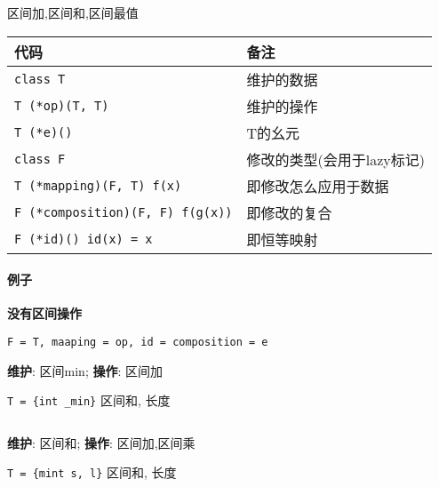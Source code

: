 区间加,区间和,区间最值

\begin{tabular}{ll}
    \hline
    代码                                    & 备注               \\
    \hline
    \verb|class T|                        & 维护的数据            \\
    \verb|T (*op)(T, T)|                  & 维护的操作            \\
    \verb|T (*e)()|                       & T的幺元             \\
    \verb|class F|                        & 修改的类型(会用于lazy标记) \\
    \verb|T (*mapping)(F, T) f(x)|        & 即修改怎么应用于数据       \\
    \verb|F (*composition)(F, F) f(g(x))| & 即修改的复合           \\
    \verb|F (*id)() id(x) = x|            & 即恒等映射            \\
    \hline
\end{tabular}

\paragraph{例子}

\textbf{没有区间操作}

\verb|F = T, maaping = op, id = composition = e|

\textbf{维护}: 区间min; \textbf{操作}: 区间加

\verb|T = {int _min}| 区间和, 长度

\inputminted{cpp}{src/src/segtree_eg1.txt}

\textbf{维护}: 区间和; \textbf{操作}: 区间加,区间乘

\verb|T = {mint s, l}| 区间和, 长度

\inputminted{cpp}{src/src/segtree_eg2.txt}
